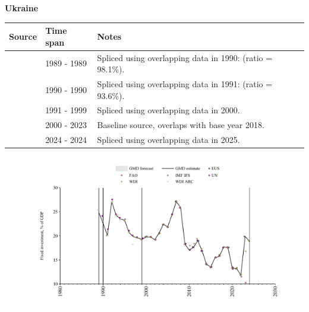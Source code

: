 \documentclass[12pt,a4paper,landscape]{article}
\begin{document}
\begin{adjustbox}{max totalsize={\paperwidth}{\paperheight},center}
\begin{minipage}[t][\textheight][t]{\textwidth}
\vspace*{0.5cm}
{}
\begin{center}
{\Large\bfseries Ukraine}
\end{center}
\vspace{0.5cm}
\begin{table}[H]
\centering
\small
\begin{tabular}{|l|l|l|}
\hline
\textbf{Source} & \textbf{Time span} & \textbf{Notes} \\
\hline
\rowcolor{white}\cite{WDI_ARC}& 1989 - 1989 &Spliced using overlapping data in 1990: (ratio = 98.1\%).\\
\rowcolor{lightgray}\cite{UN}& 1990 - 1990 &Spliced using overlapping data in 1991: (ratio = 93.6\%).\\
\rowcolor{white}\cite{WDI}& 1991 - 1999 &Spliced using overlapping data in 2000.\\
\rowcolor{lightgray}\cite{EUS}& 2000 - 2023 &Baseline source, overlaps with base year 2018.\\
\rowcolor{white}\cite{IMF_IFS}& 2024 - 2024 &Spliced using overlapping data in 2025.\\
\hline
\end{tabular}
\end{table}
\begin{figure}[H]
\centering
\includegraphics[width=\textwidth,height=0.6\textheight,keepaspectratio]{graphs/UKR_finv_GDP.pdf}
\end{figure}
\end{minipage}
\end{adjustbox}
\end{document}
